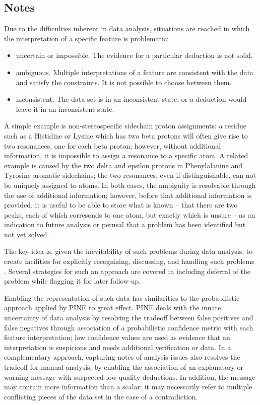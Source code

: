 \subsection{Notes}
Due to the difficulties inherent in data analysis, situations are reached
in which the interpretation of a specific feature is problematic:
\begin{itemize}
  \item uncertain or impossible.  The evidence for a particular deduction 
    is not solid.
  \item ambiguous.  Multiple interpretations of a feature are consistent
    with the data and satisfy the constraints.  It is not possible to choose
    between them.
  \item inconsistent.  The data set is in an inconsistent state, or a 
    deduction would leave it in an inconsistent state.
\end{itemize}
A simple example is non-stereospecific sidechain proton assignments: 
a residue such as a Histidine or Lysine which has two beta protons will 
often give rise to two resonances, one for each beta proton; however, 
without additional information, it is impossible to assign a resonance to
a specific atom.  A related example is caused by the two delta and epsilon
protons in Phenylalanine and Tyrosine aromatic sidechains; the two resonances,
even if distinguishable, can not be uniquely assigned to atoms.  In both
cases, the ambiguity is resolvable through the use of additional information;
however, before that additional information is provided, it is useful to be
able to store what is known -- that there are two peaks, each of which 
corresonds to one atom, but exactly which is unsure -- as an indication to
future analysis or perusal that a problem has been identified but not yet
solved.

The key idea is, given the inevitability of such problems during data
analysis, to create facilities for explicitly recognizing, discussing, 
and handling such problems \cite{robillard2007concerns}. 
Several strategies for such an approach 
are covered in \cite{nuseibeh2000inconsistency} including deferral of the
problem while flagging it for later follow-up.

Enabling the representation of such data has similarities to the probabilistic
approach applied by PINE \cite{pine} to great effect.  
PINE deals with the innate uncertainty of data 
analysis by resolving the tradeoff between false positives and false 
negatives through association of a probabilistic confidence metric with each
feature interpretation; low confidence values are used as evidence that an
interpretation is suspicious and needs additional verification or data.
In a complementary approach, capturing notes of analysis issues also 
resolves the tradeoff for manual analysis, by enabling the association of
an explanatory or warning message with suspected low-quality deductions.
In addition, the message may contain more information than a scalar: it may
necessarily refer to multiple conflicting pieces of the data set in the case
of a contradiction.

